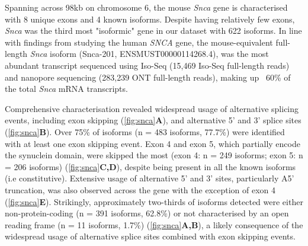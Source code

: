 Spanning across 98kb on chromosome 6, the mouse \textit{Snca} gene is characterised with 8 unique exons and 4 known isoforms. Despite having relatively few exons, \textit{Snca} was the third most "isoformic" gene in our dataset with 622 isoforms. In line with findings from studying the human \textit{SNCA} gene\cite{Tseng2019}, the mouse-equivalent full-length \textit{Snca} isoform (Snca-201, ENSMUST00000114268.4), was the most abundant transcript sequenced using Iso-Seq (15,469 Iso-Seq full-length reads) and nanopore sequencing (283,239 ONT full-length reads), making up ~60\% of the total \textit{Snca} mRNA transcripts. 

Comprehensive characterisation revealed widespread usage of alternative splicing events, including exon skipping (\cref{fig:snca}\textbf{A}), and alternative 5' and 3' splice sites (\cref{fig:snca}\textbf{B}). Over 75\% of isoforms (n  = 483 isoforms, 77.7\%) were identified with at least one exon skipping event. Exon 4 and exon 5, which partially encode the synuclein domain, were skipped the most (exon 4: n = 249 isoforms; exon 5: n = 206 isoforms) (\cref{fig:snca}\textbf{C,D}), despite being present in all the known isoforms (i.e constitutive). Extensive usage of alternative 5' and 3' sites, particularly A5' truncation, was also observed across the gene with the exception of exon 4 (\cref{fig:snca}\textbf{E}). Strikingly, approximately two-thirds of isoforms detected were either non-protein-coding (n = 391 isoforms, 62.8\%) or not characterised by an open reading frame (n = 11 isoforms, 1.7\%) (\cref{fig:snca}\textbf{A,B}), a likely consequence of the widespread usage of alternative splice sites combined with exon skipping events. 

